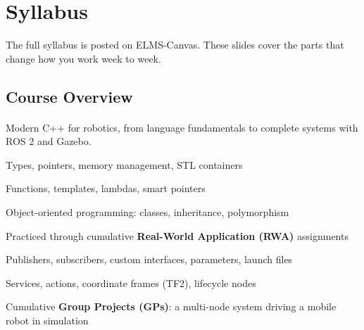 \documentclass[
    10pt,
    dvipsnames,
    svgnames,
    x11names,
    aspectratio=1610,
    english,
    codeminted]{beamer}
\begin{document}
\section{Syllabus}
\begingroup
{}
\begin{frame}
  \secdivheader{\secname}
The full syllabus is posted on ELMS-Canvas. These slides cover the parts that change how you work week to week.

\end{frame}
\endgroup


\subsection*{Course Overview}
\begingroup
\divframetrue
\renewcommand{\divbartextA}{\secname}
\renewcommand{\divbartextB}{}

\begin{frame}{\secname}
  \divbar{\secname}{\subsecname}
  

  \framesubtitle{\subsecname}
Modern C++ for robotics, from language fundamentals to complete systems with ROS 2 and Gazebo.

\begin{compactitem}
    \item Types, pointers, memory management, STL containers
    \item Functions, templates, lambdas, smart pointers
    \item Object-oriented programming: classes, inheritance, polymorphism
    \item Practiced through cumulative \textbf{Real-World Application (RWA)} assignments
\end{compactitem}

\begin{compactitem}
    \item Publishers, subscribers, custom interfaces, parameters, launch files
    \item Services, actions, coordinate frames (TF2), lifecycle nodes
    \item Cumulative \textbf{Group Projects (GPs)}: a multi-node system driving a mobile robot in simulation
\end{compactitem}
\end{frame}
\endgroup
\end{document}

